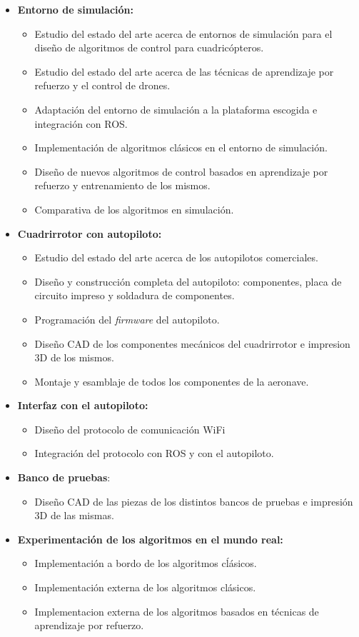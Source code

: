  \begin{itemize}
 	\item \textbf{Entorno de simulación:}
 	\begin{itemize}
 		\item Estudio del estado del arte acerca de entornos de simulación para el diseño de algoritmos de control para cuadricópteros.
 		\item Estudio del estado del arte acerca de las técnicas de aprendizaje por refuerzo y el control de drones.
 		\item Adaptación del entorno de simulación a la plataforma escogida e integración con ROS.
 		\item Implementación de algoritmos clásicos en el entorno de simulación.
 		\item Diseño de nuevos algoritmos de control basados en aprendizaje por refuerzo y entrenamiento de los mismos.
 		\item Comparativa de los algoritmos en simulación.
 	\end{itemize}
 	\item \textbf{Cuadrirrotor con autopiloto:}
 	\begin{itemize}
 		\item Estudio del estado del arte acerca de los autopilotos comerciales.
 		\item Diseño y construcción completa del autopiloto: componentes, placa de circuito impreso y soldadura de componentes.
 		\item Programación del \textit{firmware} del autopiloto.
 		\item Diseño CAD de los componentes mecánicos del cuadrirrotor e impresion 3D de los mismos.
 		\item Montaje y esamblaje de todos los componentes de la aeronave.  
 	\end{itemize}
 	\item \textbf{Interfaz con el autopiloto:}
 	\begin{itemize}
		\item Diseño del protocolo de comunicación WiFi
		\item Integración del protocolo con ROS y con el autopiloto.
	\end{itemize}
	\item \textbf{Banco de pruebas}:
		\begin{itemize}
			\item Diseño CAD de las piezas de los distintos bancos de pruebas e impresión 3D de las mismas. 
		\end{itemize}
	\item \textbf{Experimentación de los algoritmos en el mundo real:} 	\begin{itemize}
			\item Implementación a bordo de los algoritmos cĺásicos.
			\item Implementación externa de los algoritmos clásicos.
			\item Implementacion externa de los algoritmos basados en técnicas de aprendizaje por refuerzo. 
		\end{itemize}
 \end{itemize}
